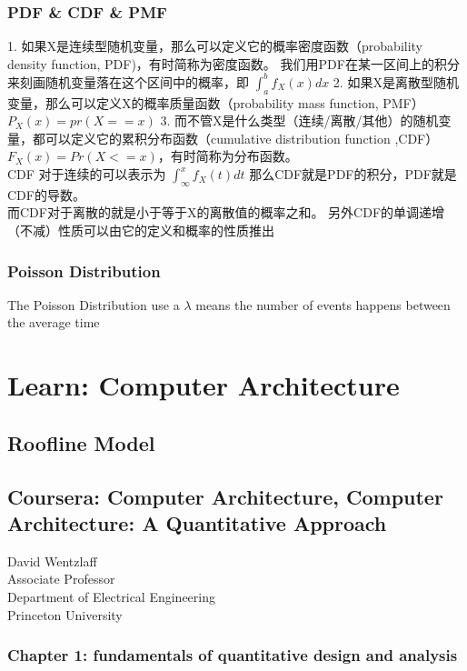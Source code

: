 \documentclass[8pt,UTF8]{article}
\begin{document}
    \subsubsection{PDF \& CDF \& PMF}
        1. 如果X是连续型随机变量，那么可以定义它的概率密度函数（probability density function, PDF)，有时简称为密度函数。 我们用PDF在某一区间上的积分来刻画随机变量落在这个区间中的概率，即 $\int^b_a f_X(x) dx$ 
        2. 如果X是离散型随机变量，那么可以定义X的概率质量函数（probability mass function, PMF）$P_X(x) = pr(X == x)$
        3. 而不管X是什么类型（连续/离散/其他）的随机变量，都可以定义它的累积分布函数（cumulative distribution function ,CDF）$F_X(x) = Pr(X <= x)$，有时简称为分布函数。 \\CDF 对于连续的可以表示为 $\int_{\infty}^x f_X(t) dt$ 那么CDF就是PDF的积分，PDF就是CDF的导数。 \\而CDF对于离散的就是小于等于X的离散值的概率之和。 另外CDF的单调递增（不减）性质可以由它的定义和概率的性质推出
    
    \subsubsection{Poisson Distribution}
        The Poisson Distribution use a $\lambda$ means the number of events happens between the average time 
        
\section{Learn: Computer Architecture}
    \subsection{Roofline Model}
    
    \subsection{Coursera: Computer Architecture, Computer Architecture: A Quantitative Approach}
        David Wentzlaff\\
        Associate Professor\\
        Department of Electrical Engineering\\
        Princeton University\\
    \subsubsection{Chapter 1: fundamentals of quantitative design and analysis}
\end{document}
